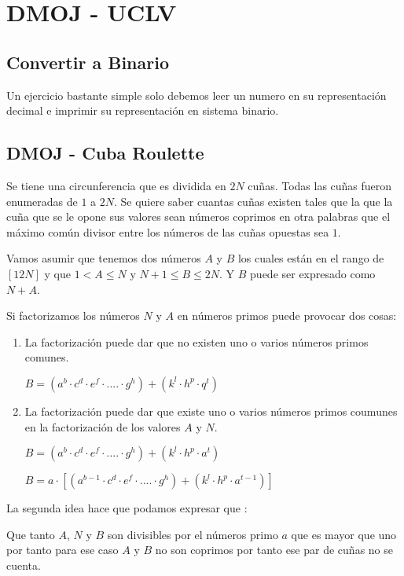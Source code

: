 \section{DMOJ - UCLV}
\subsection{Convertir a Binario} Un ejercicio bastante simple solo debemos leer un numero en su representación decimal e imprimir su representación en sistema binario.


\subsection{DMOJ - Cuba Roulette} Se tiene una circunferencia que es dividida en $2N$ cuñas. Todas las cuñas fueron enumeradas de $1$ a $2N$. Se quiere saber cuantas cuñas existen tales que la que la cuña que se le opone sus valores sean números coprimos en otra palabras que el máximo común divisor entre los números de las cuñas opuestas sea $1$.

Vamos asumir que tenemos dos números $A$ y $B$ los cuales están en el rango de $[1 2N]$ y que $1 < A \leq N$ y $N+1 \leq B \leq 2N$. Y $B$ puede ser expresado como $N+A$.

Si factorizamos los números $N$ y $A$ en números primos puede provocar dos cosas:

\begin{enumerate}
	\item La factorización puede dar que no existen uno o varios números primos comunes.
	
	$B=(a^{b} \cdot c^{d} \cdot e^{f}  \cdot .... \cdot g^{h} )+( k^{l} \cdot h^{p} \cdot q^{t})$
	
	\item La factorización puede dar que existe uno o varios números primos coumunes en la factorización de los valores $A$ y $N$.
	
	$B=(a^{b} \cdot c^{d} \cdot e^{f}  \cdot .... \cdot g^{h} )+( k^{l} \cdot h^{p} \cdot a^{t})$
	
	$B=a \cdot [(a^{b-1} \cdot c^{d} \cdot e^{f}  \cdot .... \cdot g^{h} )+( k^{l} \cdot h^{p} \cdot a^{t-1})]$
\end{enumerate} 

La segunda idea hace que podamos expresar que :

Que tanto $A$, $N$ y $B$ son divisibles por el números primo $a$ que es mayor que uno por tanto para ese caso $A$ y $B$ no son coprimos por tanto ese par de cuñas no se cuenta.

